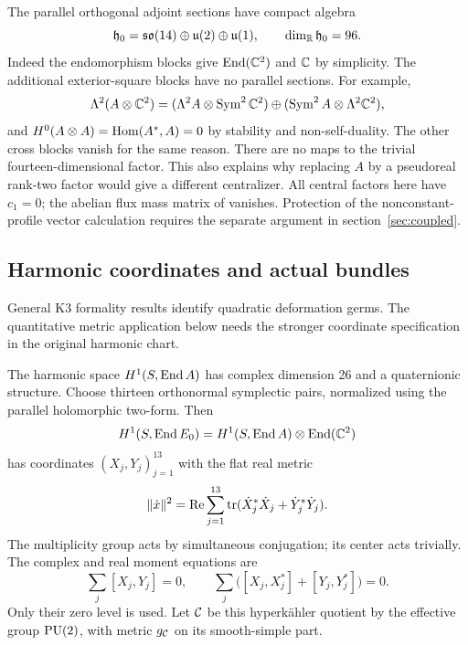 The parallel orthogonal adjoint sections have compact algebra
\begin{equation}\label{eq:centralizer}
 \mathfrak h_0=\mathfrak{so}(14)\oplus\mathfrak u(2)\oplus\mathfrak u(1),
 \qquad \dim_\mathbb R\mathfrak h_0=96.
\end{equation}
Indeed the endomorphism blocks give $\operatorname{End}(\mathbb C^2)$ and $\mathbb C$ by
simplicity. The additional exterior-square blocks have no parallel
sections. For example,
\[
 \Lambda^2(A\otimes\mathbb C^2)=
 (\Lambda^2 A\otimes\operatorname{Sym}^2\mathbb C^2)
 \oplus(\operatorname{Sym}^2 A\otimes\Lambda^2\mathbb C^2),
\]
and $H^0(A\otimes A)=\operatorname{Hom}(A^*,A)=0$ by stability and
non-self-duality. The other cross blocks vanish for the same reason.
There are no maps to the trivial fourteen-dimensional factor.
This also explains why replacing $A$ by a pseudoreal rank-two factor
would give a different centralizer. All central factors here have
$c_1=0$; the abelian flux mass matrix of \cite[section~3.2]{honecker}
vanishes. Protection of the nonconstant-profile vector calculation
requires the separate argument in section~\ref{sec:coupled}.

\subsection{Harmonic coordinates and actual bundles}\label{subsec:harmonic}
General K3 formality results \cite{budurzhang} identify quadratic
deformation germs. The quantitative metric application below needs
the stronger coordinate specification in the original harmonic chart.

The harmonic space $H^1(S,\operatorname{End} A)$ has complex dimension 26 and a
quaternionic structure. Choose thirteen orthonormal symplectic pairs,
normalized using the parallel holomorphic two-form. Then
\[
 H^1(S,\operatorname{End} E_0)=H^1(S,\operatorname{End} A)\otimes\operatorname{End}(\mathbb C^2)
\]
has coordinates $(X_j,Y_j)_{j=1}^{13}$ with the flat real metric
\begin{equation}\label{eq:flatmetric}
 \|\dot x\|^2=\operatorname{Re}\sum_{j=1}^{13}
 \operatorname{tr}(\dot X_j^*\dot X_j+\dot Y_j^*\dot Y_j).
\end{equation}
The multiplicity group acts by simultaneous conjugation; its center
acts trivially. The complex and real moment equations are
\begin{equation}\label{eq:moments}
 \sum_j[X_j,Y_j]=0,\qquad
 \sum_j\bigl([X_j,X_j^*]+[Y_j,Y_j^*]\bigr)=0.
\end{equation}
Only their zero level is used. Let $\mathcal C$ be this hyperk\"ahler
quotient by the effective group $\operatorname{PU}(2)$, with metric $g_{\mathcal C}$ on its
smooth-simple part.

